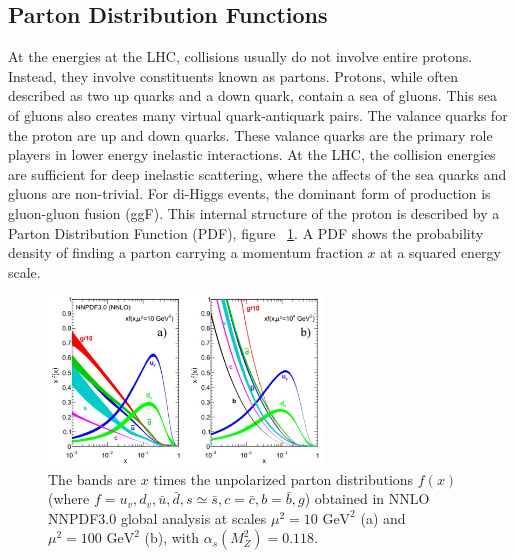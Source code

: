 \subsection{Parton Distribution Functions}
\indent At the energies at the LHC, collisions usually do not involve entire protons. Instead, they involve constituents known as partons. Protons, while often described as two up quarks and a down quark, contain a sea of gluons. This sea of gluons also creates many virtual quark-antiquark pairs. The valance quarks for the proton are up and down quarks. These valance quarks are the primary role players in lower energy inelastic interactions. At the LHC, the collision energies are sufficient for deep inelastic scattering, where the affects of the sea quarks and gluons are non-trivial. For di-Higgs events, the dominant form of production is gluon-gluon fusion (ggF). This internal structure of the proton is described  by a Parton Distribution Function (PDF), figure ~\ref{fig:pdf}. A PDF shows the probability density of finding a parton carrying a momentum fraction ${x}$ at a squared energy scale. %
\newline

\begin{figure}[h]
\begin{center}
\includegraphics*[width=0.65\textwidth] {figures/pdf.jpg}
\caption[Parton distribution function]{The bands are ${x}$ times the unpolarized parton distributions
${f(x)}$ (where ${f = u_{v}, d_{v}, \bar{u}, \bar{d}, s \simeq{} \bar{s}, c = \bar{c}, b = \bar{b}, g}$) obtained in NNLO NNPDF3.0
global analysis at scales ${\mu^{2} = 10  \text{ GeV}^{2}}$
(a) and ${\mu^{2} = 100  \text{ GeV}^{2}}$ (b), with
${\alpha_{s}(M^{2}_{Z}) = 0.118}$.}
\label{fig:pdf}
\end{center}
\end{figure}


